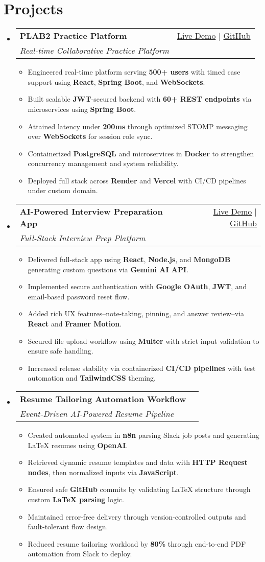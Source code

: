 \documentclass[letterpaper,11pt]{article}
\makeatletter
\newcommand{\resumeItem}[1]{\item\small{#1 \vspace{-2pt}}}
\newcommand{\resumeSubheading}[4]{
  \vspace{-1pt}\item
    \begin{tabular*}{0.97\textwidth}[t]{l@{\extracolsep{\fill}}r}
      \textbf{#1} & #2 \\
      \textit{\small#3} & \textit{\small #4} \\
    \end{tabular*}\vspace{-5pt}
}
\newcommand{\resumeSubHeadingListStart}{\begin{itemize}[leftmargin=*]}
\newcommand{\resumeSubHeadingListEnd}{\end{itemize}}
\newcommand{\resumeItemListStart}{\begin{itemize}}
\newcommand{\resumeItemListEnd}{\end{itemize}\vspace{-5pt}}
\makeatother
\begin{document}
\section{Projects}
  \resumeSubHeadingListStart
    \resumeSubheading
      {\textbf{PLAB2 Practice Platform}}{\href{https://plab2practice.com}{Live Demo} | \href{https://github.com/altansaid/plab2projectnew}{GitHub}}
      {Real-time Collaborative Practice Platform}{}
      \resumeItemListStart
        \resumeItem{Engineered real-time platform serving \textbf{500+ users} with timed case support using \textbf{React}, \textbf{Spring Boot}, and \textbf{WebSockets}.}
        \resumeItem{Built scalable \textbf{JWT}-secured backend with \textbf{60+ REST endpoints} via microservices using \textbf{Spring Boot}.}
        \resumeItem{Attained latency under \textbf{200ms} through optimized STOMP messaging over \textbf{WebSockets} for session role sync.}
        \resumeItem{Containerized \textbf{PostgreSQL} and microservices in \textbf{Docker} to strengthen concurrency management and system reliability.}
        \resumeItem{Deployed full stack across \textbf{Render} and \textbf{Vercel} with CI/CD pipelines under custom domain.}
      \resumeItemListEnd

    \resumeSubheading
      {\textbf{AI-Powered Interview Preparation App}}{\href{https://interviewcoach-ai.vercel.app}{Live Demo} | \href{https://github.com/altansaid/interviewcoach-ai}{GitHub}}
      {Full-Stack Interview Prep Platform}{}
      \resumeItemListStart
        \resumeItem{Delivered full-stack app using \textbf{React}, \textbf{Node.js}, and \textbf{MongoDB} generating custom questions via \textbf{Gemini AI API}.}
        \resumeItem{Implemented secure authentication with \textbf{Google OAuth}, \textbf{JWT}, and email-based password reset flow.}
        \resumeItem{Added rich UX features--note-taking, pinning, and answer review--via \textbf{React} and \textbf{Framer Motion}.}
        \resumeItem{Secured file upload workflow using \textbf{Multer} with strict input validation to ensure safe handling.}
        \resumeItem{Increased release stability via containerized \textbf{CI/CD pipelines} with test automation and \textbf{TailwindCSS} theming.}
      \resumeItemListEnd

    \resumeSubheading
      {\textbf{Resume Tailoring Automation Workflow}}{} {Event-Driven AI-Powered Resume Pipeline}{}
      \resumeItemListStart
        \resumeItem{Created automated system in \textbf{n8n} parsing Slack job posts and generating LaTeX resumes using \textbf{OpenAI}.}
        \resumeItem{Retrieved dynamic resume templates and data with \textbf{HTTP Request nodes}, then normalized inputs via \textbf{JavaScript}.}
        \resumeItem{Ensured safe \textbf{GitHub} commits by validating LaTeX structure through custom \textbf{LaTeX parsing} logic.}
        \resumeItem{Maintained error-free delivery through version-controlled outputs and fault-tolerant flow design.}
        \resumeItem{Reduced resume tailoring workload by \textbf{80\%} through end-to-end PDF automation from Slack to deploy.}
      \resumeItemListEnd
  \resumeSubHeadingListEnd
\end{document}
